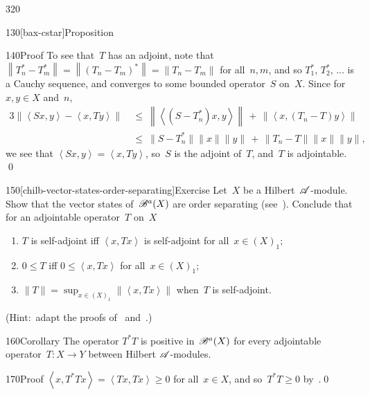 \begin{parsec}{320}
\begin{point}{130}[bax-cstar]{Proposition}
\begin{point}{140}{Proof}
To see that~$T$ has an adjoint,
note that~$\left\|T_n^*-T_m^*\right\|
=\left\|(T_n-T_m)^*\right\|
=\left\|T_n-T_m\right\|$
for all~$n,m$, and so $T_1^*,\,T_2^*,\,\dotsc$
is a Cauchy sequence,
and converges to some bounded operator~$S$ on~$X$.
Since for~$x,y\in X$ and~$n$,
\begin{alignat*}{3}
\left\|\left<Sx,y\right>-\left<x,Ty\right>\right\|
\ &\leq\ 
\left\|\left<(S-T^*_n)x,y\right>\right\|
\,+\,
\left\|\left<x,(T_n-T)y\right>\right\|
\\
\ &\leq\ 
\|S-T^*_n\|\|x\|\|y\|\,+\,\|T_n-T\|\|x\|\|y\|,
\end{alignat*}
we see that $\left<Sx,y\right>=\left<x,Ty\right>$,
so~$S$ is the adjoint of~$T$,
and~$T$ is adjointable.
\qed
\end{point}
\end{point}
\begin{point}{150}[chilb-vector-states-order-separating]{Exercise}%
Let~$X$ be a Hilbert~$\mathscr{A}$-module.
Show that 
the vector states%
of~$\mathscr{B}^a(X)$
are order separating (see~\sref{separating}).
Conclude that 
for an adjointable operator~$T$ on~$X$
\begin{enumerate}
\item
$T$ is self-adjoint iff $\left<x,Tx\right>$
is self-adjoint for all~$x\in (X)_1$;
\item
$0\leq T$ iff $0\leq\left<x,Tx\right>$
for all~$x\in (X)_1$;
\item
	$\|T\|=\sup_{x\in (X)_1}\|\left<x,Tx\right>\|$
when~$T$ is self-adjoint.
\end{enumerate}
(Hint:~adapt the proofs
of~
and~.)
\end{point}
\begin{point}{160}{Corollary}%
The operator
$T^*T$ is positive
in~$\mathscr{B}^a(X)$
for every adjointable operator~$T\colon X\to Y$
between Hilbert $\mathscr{A}$-modules.
\begin{point}{170}{Proof}%
$\left<x,T^*Tx\right>=
\left<Tx,Tx\right> \geq 0$
for all~$x\in X$,
and so~$T^*T\geq 0$ by~.\qed
\end{point}
\end{point}
\end{parsec}
